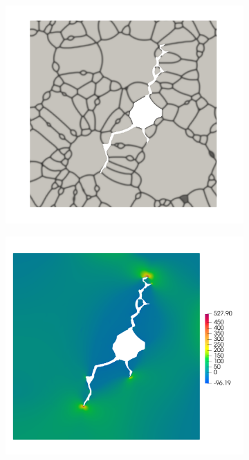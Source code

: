 \begin{figure}[htbp!]
  \begin{subfigure}[t]{0.35\linewidth}
    \centering
    \includegraphics[width=\linewidth]{Chapter3/figures/partial_hbs_2}
    \caption{}
  \end{subfigure}
  \begin{subfigure}[t]{0.35\linewidth}
    \centering
    \includegraphics[width=\linewidth]{Chapter3/figures/partial_hbs_2_stress}
    \caption{}
  \end{subfigure}
  

\end{figure}
